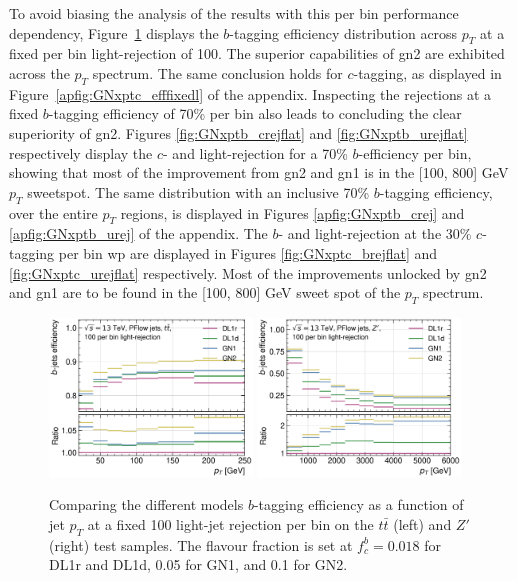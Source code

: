 To avoid biasing the analysis of the results with this per bin performance dependency, Figure~\ref{fig:GNxptb_efffixedl} displays the $b$-tagging efficiency distribution across $p_T$ at a fixed per bin light-rejection of 100. The superior capabilities of \gls{gn2} are exhibited across the $p_T$ spectrum. The same conclusion holds for $c$-tagging, as displayed in Figure~\ref{apfig:GNxptc_efffixedl} of the appendix. Inspecting the rejections at a fixed $b$-tagging efficiency of 70\% per bin also leads to concluding the clear superiority of \gls{gn2}. Figures \ref{fig:GNxptb_crejflat} and \ref{fig:GNxptb_urejflat} respectively display the $c$- and light-rejection for a 70\% $b$-efficiency per bin, showing that most of the improvement from \gls{gn2} and \gls{gn1} is in the [100, 800] GeV $p_T$ sweetspot. The same distribution with an inclusive 70\% $b$-tagging efficiency, over the entire $p_T$ regions, is displayed in Figures \ref{apfig:GNxptb_crej} and \ref{apfig:GNxptb_urej} of the appendix. The $b$- and light-rejection at the 30\% $c$-tagging per bin \gls{wp} are displayed in Figures \ref{fig:GNxptc_brejflat} and \ref{fig:GNxptc_urejflat} respectively. Most of the improvements unlocked by \gls{gn2} and \gls{gn1} are to be found in the [100, 800] GeV sweet spot of the $p_T$ spectrum. \\

\begin{figure}[h!]
  \centering
  \includegraphics[width=0.48\textwidth]{Images/FTAG/GN/GN2/pt_plots/pt_ttbar_b_eff_fixedlight.png}
  \includegraphics[width=0.48\textwidth]{Images/FTAG/GN/GN2/pt_plots/pt_zp_b_eff_fixedlight.png}
  \caption{Comparing the different models $b$-tagging efficiency as a function of jet $p_T$ at a fixed 100 light-jet rejection per bin on the $t\bar{t}$ (left) and $Z'$ (right) test samples. The flavour fraction is set at $f^b_c = 0.018$ for DL1r and DL1d, 0.05 for GN1, and 0.1 for GN2.}
  \label{fig:GNxptb_efffixedl}
\end{figure} 

